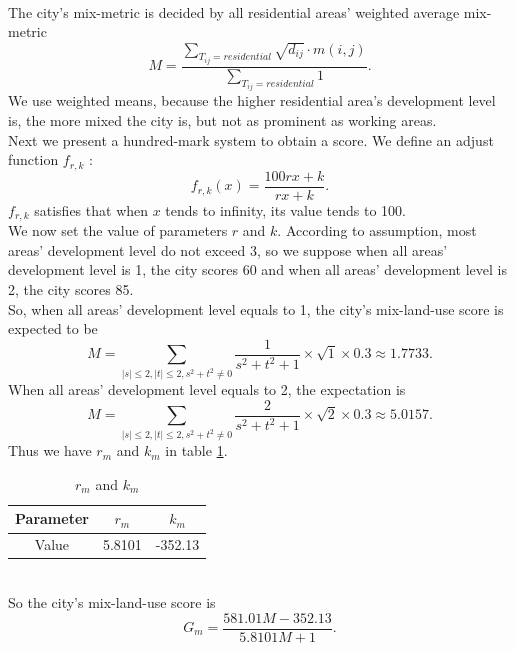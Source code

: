 \\
The city's mix-metric is decided by all residential areas' weighted average mix-metric $$ M=\frac{\sum_{T_{ij}=residential} \sqrt{d_{ij}} \cdot m(i,j)}{\sum_{T_{ij}=residential} 1}. $$
We use weighted means, because the higher residential area's development level is, the more mixed the city is, but not as prominent as working areas.
\\
Next we present a hundred-mark system to obtain a score.
We define an adjust function $ f_{r,k} $ : $$ f_{r,k}(x) = \frac{100rx+k}{rx+k}. $$ $ f_{r,k} $ satisfies that when $x$ tends to infinity, its value tends to 100.
\\
We now set the value of parameters $r$ and $k$.
According to assumption, most areas' development level do not exceed 3, so we suppose when all areas' development level is 1, the city scores 60 and when all areas' development level is 2, the city scores 85.
\\
So, when all areas' development level equals to 1, the city's mix-land-use score is expected to be $$ M=\sum_{|s|\leq 2, |t|\leq 2, s^2+t^2 \neq 0} \frac{1}{s^2+t^2+1} \times \sqrt{1} \times 0.3 \approx 1.7733. $$
When all areas' development level equals to 2, the expectation is $$ M=\sum_{|s|\leq 2, |t|\leq 2, s^2+t^2 \neq 0} \frac{2}{s^2+t^2+1} \times \sqrt{2} \times 0.3 \approx 5.0157. $$
Thus we have $ r_m $ and $ k_m $ in table \ref{tab:f1-data}.
\begin{table}[tb]
\centering
  \begin{tabular}{c|cc}
    \hline
    Parameter & $r_m$ & $k_m$ \\
    \hline
    Value & 5.8101 & -352.13 \\
    \hline
  \end{tabular}
  \caption{$r_m$ and $k_m$}
  \label{tab:f1-data}
\end{table}
\\
So the city's mix-land-use score is $$ G_m=\frac{581.01M-352.13}{5.8101M+1}. $$
\\

